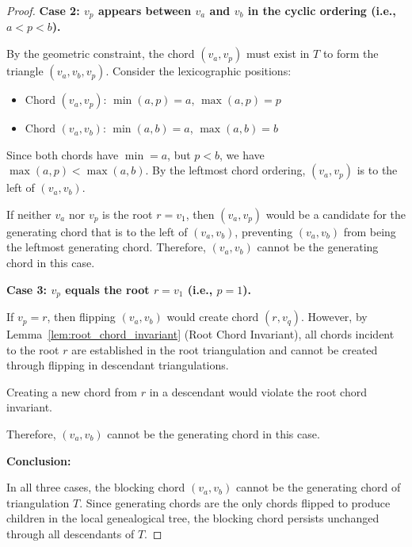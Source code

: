 \documentclass[12pt,a4paper]{article}
\theoremstyle{definition}
\theoremstyle{remark}
\begin{document}
\begin{proof}
\textbf{Case 2: $v_p$ appears between $v_a$ and $v_b$ in the cyclic ordering (i.e., $a < p < b$).}

By the geometric constraint, the chord $(v_a, v_p)$ must exist in $T$ to form the triangle $(v_a, v_b, v_p)$. Consider the lexicographic positions:
\begin{itemize}
    \item Chord $(v_a, v_p)$: $\min(a, p) = a$, $\max(a, p) = p$
    \item Chord $(v_a, v_b)$: $\min(a, b) = a$, $\max(a, b) = b$
\end{itemize}

Since both chords have $\min = a$, but $p < b$, we have $\max(a, p) < \max(a, b)$. By the leftmost chord ordering, $(v_a, v_p)$ is to the left of $(v_a, v_b)$.

If neither $v_a$ nor $v_p$ is the root $r = v_1$, then $(v_a, v_p)$ would be a candidate for the generating chord that is to the left of $(v_a, v_b)$, preventing $(v_a, v_b)$ from being the leftmost generating chord. Therefore, $(v_a, v_b)$ cannot be the generating chord in this case.

\textbf{Case 3: $v_p$ equals the root $r = v_1$ (i.e., $p = 1$).}

If $v_p = r$, then flipping $(v_a, v_b)$ would create chord $(r, v_q)$. However, by Lemma~\ref{lem:root_chord_invariant} (Root Chord Invariant), all chords incident to the root $r$ are established in the root triangulation and cannot be created through flipping in descendant triangulations.

Creating a new chord from $r$ in a descendant would violate the root chord invariant.

Therefore, $(v_a, v_b)$ cannot be the generating chord in this case.

\textbf{Conclusion:}

In all three cases, the blocking chord $(v_a, v_b)$ cannot be the generating chord of triangulation $T$. Since generating chords are the only chords flipped to produce children in the local genealogical tree, the blocking chord persists unchanged through all descendants of $T$.
\end{proof}
\end{document}
